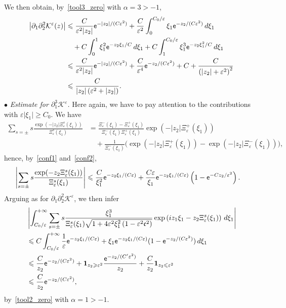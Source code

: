 \documentclass[AHL,Unicode,longabstracts,published]{cedram}
\newcommand*\p{\partial}
\newcommand*\BK{\mathcal{K}}
\newcommand{\bfun}{\mathbf{1}}
\newcommand*\ex{{\sf e}}
\newcommand*\cs{{\mathfrak c}}
\newcommand*\ii{\infty}
\newcommand*\gs{\geqslant }
\newcommand*\ls{\leqslant }
\newcommand*\e{\varepsilon}
\renewcommand*\a{\alpha}
\begin{document}
We then obtain, by~\eqref{tool3_zero} with $ \a = 3 > -1 $,
\begin{align*}
\left\lvert \p_1 \p_2^2 \BK^\e (z)\right\rvert &
\ls \frac{C}{\e^2 |z_2| } \ex^{ - |z_2| / (C\e^2) } + \frac{ C}{\e^2} \int_0^{ C_0 / \e } \xi_1 \ex^{- z_2 / (C \e^2) } \, d\xi_1
\\
& \quad + C \int_0^{1} \xi_1^2 \ex^{- z_2 \xi_1 / C } \, d\xi_1 + C \int_1^{ C_0 / \e } \xi_1^3 \ex^{- z_2 \xi_1^2 / C } \, d\xi_1
\\ &
\ls \frac{C}{\e^2 |z_2| } \ex^{ - |z_2| / (C\e^2) } + \frac{C}{\e^4} \ex^{- z_2 / (C \e^2) } + C + \frac{C}{\left(|z_2| + \e^2\right)^2 }
\\ &
\ls \frac{C}{ |z_2| \left(\e^2 + |z_2|\right) }.
\end{align*}
\noindent $ \bullet $ \emph{Estimate for $ \p_1^3 \BK^\e $.} Here again, we have to pay attention to the contributions with $ \e \lvert \xi_1 \rvert \gs C_0 $. We have
\begin{align*}
\sum_{ s = \pm} s \frac{ \exp(-|z_2| \Xi_\e^s (\xi_1)) }{ \Xi_\e^s (\xi_1) } & = \frac{ \Xi_\e^- (\xi_1) - \Xi_\e^+ (\xi_1) }{ \Xi_\e^- (\xi_1) \Xi_\e^+ (\xi_1) } \exp(-|z_2| \Xi_\e^+ (\xi_1))
\\ & \quad + \frac{ 1}{\Xi_\e^- (\xi_1) } \Big(\exp(-|z_2| \Xi_\e^+ (\xi_1)) - \exp(-|z_2| \Xi_\e^- (\xi_1)) \Big),
\end{align*}
hence, by~\eqref{conf1} and~\eqref{conf2},
\begin{align*}
\left\lvert \sum_{ s = \pm} s \frac{ \exp(- z_2 \Xi_\e^s (\xi_1)) }{ \Xi_\e^s (\xi_1) } \right\rvert & \ls \frac{ C}{ \xi_1^2 } \ex^{ - z_2 \xi_1/ (C\e) } + \frac{ C\e}{ \xi_1 } \ex^{ - z_2 \xi_1/ (C\e) }\left(1 - \ex^{ - C z_2 /\e^2}\right).
\end{align*}
Arguing as for $ \p_1\p_2^2 \BK^\e $, we then infer
\begin{align*}
& \left\lvert \int_{C_0 /\e }^{+\ii}
\sum_{ s = \pm} s \frac{ \xi_1^3 }{\Xi_\e^s (\xi_1) \sqrt{1 + 4 \e^2 \xi_1^2 \left(1 - \e^2 \cs^2\right) } }
\exp\left(i z_1 \xi_1 - z_2 \Xi_\e^s (\xi_1)\right) \, d \xi_1 \right\rvert
\\ & \ls C \int_{C_0/ \e}^{+\ii}
\frac{ 1}{ \e } \ex^{ - z_2 \xi_1/ (C\e) } + \xi_1 \ex^{ - z_2 \xi_1/ (C\e) } (1 - \ex^{ - z_2 / (C\e^2) })
\, d \xi_1
\\ & \ls
\frac{ C}{ z_2 } \ex^{ - z_2 / (C\e^2)} + \bfun_{ z_2 \gs \e^2} \frac{ \ex^{- z_2 / (C' \e^2)} }{ z_2} + \frac{C}{ z_2 } \bfun_{ z_2 \ls \e^2}
\\ & \ls
\frac{ C}{ z_2 } \ex^{ - z_2 / (C\e^2)},
\end{align*}
by~\eqref{tool2_zero} with $ \alpha = 1 > -1 $.
\end{document}
